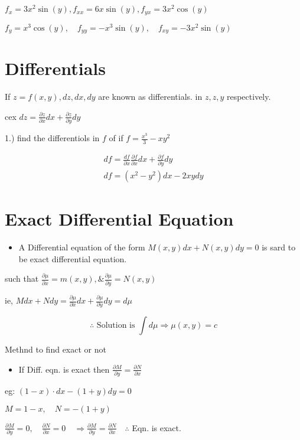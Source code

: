 \documentclass[12pt, a4paper]{article}
\begin{document}
$f_{x}=3 x^{2} \sin (y), f_{x x}=6 x \sin (y), f_{y x}=3 x^{2} \cos (y)$

$f_{y}=x^{3} \cos (y), \quad f_{y y}=-x^{3} \sin (y), \quad f_{x y}=-3 x^{2} \sin (y)$

\section*{Differentials}
If $z=f(x, y), d z, d x, d y$ are known as differentials. in $z, z, y$ respectively.

cex $d z=\frac{\partial z}{\partial x} d x+\frac{\partial z}{\partial y} d y$

1.) find the differentiols in $f$ of if $f=\frac{x^{3}}{3}-x y^{2}$

$$
\begin{array}{r}
d f=\frac{d f}{\partial x} \frac{\partial f}{\partial x} d x+\frac{\partial f}{\partial y} d y \\
d f=\left(x^{2}-y^{2}\right) d x-2 x y d y
\end{array}
$$

\section*{Exact Differential Equation}
\begin{itemize}
  \item A Differential equation of the form $M(x, y) d x+N(x, y) d y=0$ is sard to be exact differential equation.
\end{itemize}

such that $\frac{\partial \mu}{\partial x}=m(x, y), \& \frac{\partial \mu}{\partial y}=N(x, y)$

ie, $M d x+N d y=\frac{\partial \mu}{\partial x} d x+\frac{\partial \mu}{\partial y} d y=d \mu$

$$
\therefore \text { Solution is } \int d \mu \Rightarrow \mu(x, y)=c
$$

Methnd to find exact or not

\begin{itemize}
  \item If Diff. eqn. is exact then $\frac{\partial M}{\partial y}=\frac{\partial N}{\partial x}$
\end{itemize}

eg: $(1-x) \cdot d x-(1+y) d y=0$

$M=1-x, \quad N=-(1+y)$

$\frac{\partial M}{\partial y}=0, \quad \frac{\partial N}{\partial x}=0 \quad \Rightarrow \frac{\partial M}{\partial y}=\frac{\partial N}{\partial x} \quad \therefore$ Eqn. is exact.
\end{document}
